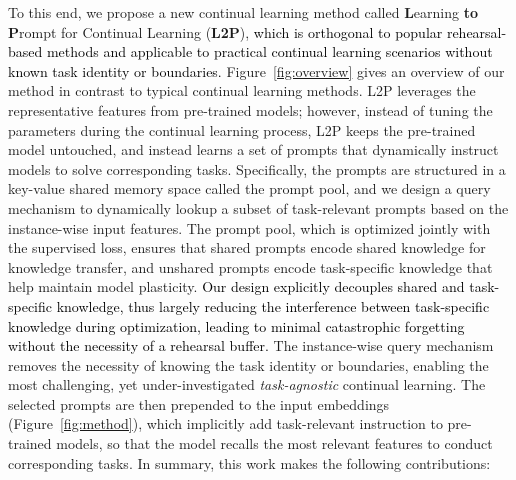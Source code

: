 \documentclass[10pt,twocolumn,letterpaper]{article}
\newcommand{\zifeng}[1]{\textcolor{black}{#1}}
\newcommand{\methodabbr}{L2P\xspace}
\begin{document}
To this end, we propose a new continual learning method called \textbf{L}earning \textbf{to} \textbf{P}rompt for Continual Learning (\textbf{\methodabbr}), \zifeng{which is orthogonal to popular rehearsal-based methods and applicable to practical continual learning scenarios without known task identity or boundaries.}
Figure~\ref{fig:overview} gives an overview of our method in contrast to typical continual learning methods.
\methodabbr leverages the representative features from pre-trained models; however, instead of tuning the parameters during the continual learning process, \methodabbr keeps the pre-trained model untouched, and instead learns a set of prompts that dynamically instruct models to solve corresponding tasks. %
Specifically, the prompts are structured in a key-value shared memory space called the prompt pool, and we design a query mechanism to dynamically lookup a subset of task-relevant prompts based on the instance-wise input features. 
The prompt pool, which is optimized jointly with the supervised loss, ensures that shared prompts encode shared knowledge for knowledge transfer, and unshared prompts encode task-specific knowledge that help maintain model plasticity. 
\zifeng{Our design explicitly decouples shared and task-specific knowledge, thus largely reducing the interference between task-specific knowledge during optimization, leading to minimal catastrophic forgetting without the necessity of a rehearsal buffer.}
The instance-wise query mechanism removes the necessity of knowing the task identity or boundaries, enabling the most challenging, yet under-investigated \emph{task-agnostic} continual learning.
The selected prompts are then prepended to the input embeddings (Figure~\ref{fig:method}), which implicitly add task-relevant instruction to pre-trained models, so that the model recalls the most relevant features to conduct corresponding tasks. 
In summary, this work makes the following contributions:
\end{document}
